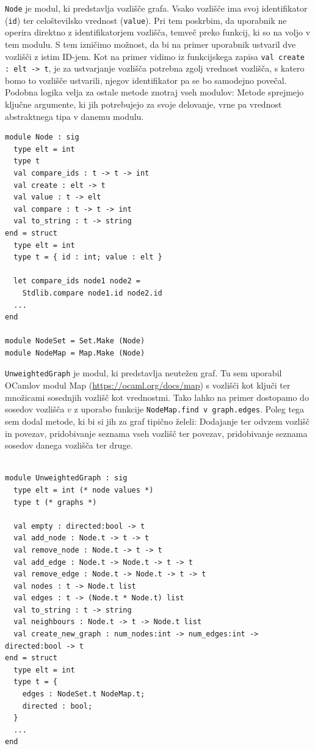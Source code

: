 \documentclass[mat1, tisk]{fmfdelo}
\begin{document}
\texttt{Node} je modul, ki predstavlja vozlišče grafa. 
Vsako vozlišče ima svoj identifikator (\texttt{id}) ter celoštevilsko vrednost (\texttt{value}). Pri tem poskrbim, da uporabnik ne 
operira direktno z identifikatorjem vozlišča, temveč preko funkcij, ki so na voljo v tem modulu.
S tem izničimo možnost, da bi na primer uporabnik ustvaril dve vozlišči z istim ID-jem. 
Kot na primer vidimo iz funkcijskega zapisa \texttt{val create : elt -> t}, je za ustvarjanje vozlišča potrebna
zgolj vrednost vozlišča, s katero bomo to vozlišče ustvarili, njegov identifikator pa se bo samodejno povečal.
Podobna logika velja za ostale metode znotraj vseh modulov: Metode sprejmejo ključne argumente, ki jih potrebujejo
za svoje delovanje, vrne pa vrednost abstraktnega tipa v danemu modulu.

\begin{lstlisting}
module Node : sig
  type elt = int
  type t
  val compare_ids : t -> t -> int
  val create : elt -> t
  val value : t -> elt
  val compare : t -> t -> int
  val to_string : t -> string
end = struct
  type elt = int
  type t = { id : int; value : elt }

  let compare_ids node1 node2 = 
    Stdlib.compare node1.id node2.id
  ...
end

module NodeSet = Set.Make (Node)
module NodeMap = Map.Make (Node)

\end{lstlisting}

\texttt{UnweightedGraph} je modul, ki predstavlja neutežen graf. 
Tu sem uporabil OCamlov modul Map (\url{https://ocaml.org/docs/map}) s vozlišči kot ključi ter množicami sosednjih vozlišč
kot vrednostmi. Tako lahko na primer dostopamo do sosedov vozlišča $v$ z uporabo funkcije \texttt{NodeMap.find v graph.edges}.
Poleg tega sem dodal metode, ki bi si jih za graf tipično želeli: Dodajanje ter odvzem
vozlišč in povezav, pridobivanje seznama vseh vozlišč ter povezav, pridobivanje seznama sosedov danega vozlišča
ter druge.

\begin{lstlisting}

module UnweightedGraph : sig
  type elt = int (* node values *)
  type t (* graphs *)

  val empty : directed:bool -> t
  val add_node : Node.t -> t -> t
  val remove_node : Node.t -> t -> t
  val add_edge : Node.t -> Node.t -> t -> t
  val remove_edge : Node.t -> Node.t -> t -> t
  val nodes : t -> Node.t list
  val edges : t -> (Node.t * Node.t) list
  val to_string : t -> string
  val neighbours : Node.t -> t -> Node.t list
  val create_new_graph : num_nodes:int -> num_edges:int -> directed:bool -> t
end = struct
  type elt = int
  type t = {
    edges : NodeSet.t NodeMap.t;
    directed : bool;
  }
  ...
end

\end{lstlisting}
\end{document}
